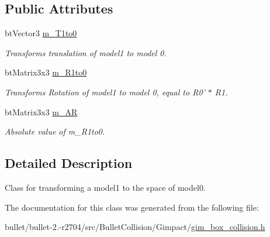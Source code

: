 \subsection*{Public Attributes}
\begin{DoxyCompactItemize}
\item 
\hypertarget{class_g_i_m___b_o_x___b_o_x___t_r_a_n_s_f_o_r_m___c_a_c_h_e_af6aacf8817de360554f57799db41c8b4}{bt\+Vector3 \hyperlink{class_g_i_m___b_o_x___b_o_x___t_r_a_n_s_f_o_r_m___c_a_c_h_e_af6aacf8817de360554f57799db41c8b4}{m\+\_\+\+T1to0}}\label{class_g_i_m___b_o_x___b_o_x___t_r_a_n_s_f_o_r_m___c_a_c_h_e_af6aacf8817de360554f57799db41c8b4}

\begin{DoxyCompactList}\small\item\em Transforms translation of model1 to model 0. \end{DoxyCompactList}\item 
\hypertarget{class_g_i_m___b_o_x___b_o_x___t_r_a_n_s_f_o_r_m___c_a_c_h_e_a97597f0d242e71eb8ad458838428aa09}{bt\+Matrix3x3 \hyperlink{class_g_i_m___b_o_x___b_o_x___t_r_a_n_s_f_o_r_m___c_a_c_h_e_a97597f0d242e71eb8ad458838428aa09}{m\+\_\+\+R1to0}}\label{class_g_i_m___b_o_x___b_o_x___t_r_a_n_s_f_o_r_m___c_a_c_h_e_a97597f0d242e71eb8ad458838428aa09}

\begin{DoxyCompactList}\small\item\em Transforms Rotation of model1 to model 0, equal to R0' $\ast$ R1. \end{DoxyCompactList}\item 
\hypertarget{class_g_i_m___b_o_x___b_o_x___t_r_a_n_s_f_o_r_m___c_a_c_h_e_ac6241a28e1c1c1e4a581ba547e30409e}{bt\+Matrix3x3 \hyperlink{class_g_i_m___b_o_x___b_o_x___t_r_a_n_s_f_o_r_m___c_a_c_h_e_ac6241a28e1c1c1e4a581ba547e30409e}{m\+\_\+\+A\+R}}\label{class_g_i_m___b_o_x___b_o_x___t_r_a_n_s_f_o_r_m___c_a_c_h_e_ac6241a28e1c1c1e4a581ba547e30409e}

\begin{DoxyCompactList}\small\item\em Absolute value of m\+\_\+\+R1to0. \end{DoxyCompactList}\end{DoxyCompactItemize}


\subsection{Detailed Description}
Class for transforming a model1 to the space of model0. 

The documentation for this class was generated from the following file\+:\begin{DoxyCompactItemize}
\item 
bullet/bullet-\/2.-\/r2704/src/\+Bullet\+Collision/\+Gimpact/\hyperlink{gim__box__collision_8h}{gim\+\_\+box\+\_\+collision.\+h}\end{DoxyCompactItemize}
